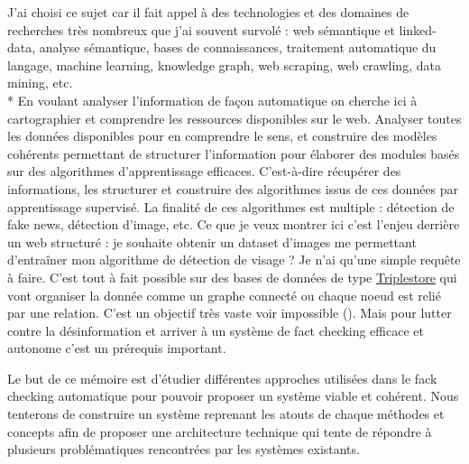 J'ai choisi ce sujet car il fait appel à des technologies et des domaines de recherches très nombreux que j'ai souvent survolé : web sémantique et linked-data, analyse sémantique, bases de connaissances, traitement automatique du langage, machine learning, knowledge graph, web scraping, web crawling, data mining, etc. 
\\*
En voulant analyser l'information de façon automatique on cherche ici à cartographier et comprendre les ressources disponibles sur le web. Analyser toutes les données disponibles pour en comprendre le sens, et construire des modèles cohérents permettant de structurer l'information pour élaborer des modules basés sur des algorithmes d'apprentissage efficaces. C'est-à-dire récupérer des informations, les structurer et construire des algorithmes issus de ces données par apprentissage supervisé. La finalité de ces algorithmes est multiple : détection de fake news, détection d'image, etc. Ce que je veux montrer ici c'est l'enjeu derrière un web structuré : je souhaite obtenir un dataset d'images me permettant d'entraîner mon algorithme de détection de visage ? Je n'ai qu'une simple requête à faire. C'est tout à fait possible sur des bases de données de type \href{https://fr.wikipedia.org/wiki/Triplestore}{Triplestore} \cite{wiki:Triplestore} qui vont organiser la donnée comme un graphe connecté ou chaque noeud est relié par une relation. C'est un objectif très vaste voir impossible (). Mais pour lutter contre la désinformation et arriver à un système de fact checking efficace et autonome c'est un prérequis important.

Le but de ce mémoire est d'étudier différentes approches utilisées dans le fack checking automatique pour pouvoir proposer un système viable et cohérent. Nous tenterons de construire un système reprenant les atouts de chaque méthodes et concepts afin de proposer une architecture technique qui tente de répondre à plusieurs problématiques rencontrées par les systèmes existants.

